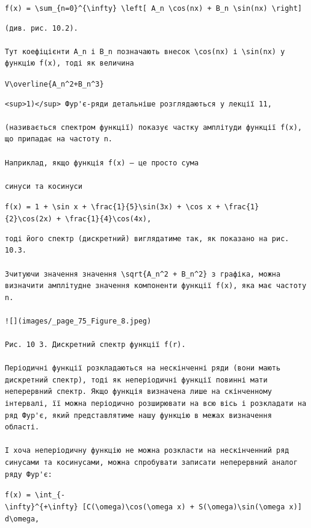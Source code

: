 \documentclass[
  ukrainian,
]{article}
\begin{document}
\texttt{f(x)\ =\ \textbackslash{}sum\_\{n=0\}\^{}\{\textbackslash{}infty\}\ \textbackslash{}left{[}\ A\_n\ \textbackslash{}cos(nx)\ +\ B\_n\ \textbackslash{}sin(nx)\ \textbackslash{}right{]}}

\begin{verbatim}
(див. рис. 10.2).

Тут коефіцієнти A_n і B_n позначають внесок \cos(nx) і \sin(nx) у функцію f(x), тоді як величина
\end{verbatim}

\texttt{V\textbackslash{}overline\{A\_n\^{}2+B\_n\^{}3\}}

\begin{verbatim}
<sup>1)</sup> Фур'є-ряди детальніше розглядаються у лекції 11,

(називається спектром функції) показує частку амплітуди функції f(x), що припадає на частоту n.

Наприклад, якщо функція f(x) — це просто сума

синуси та косинуси
\end{verbatim}

\texttt{f(x)\ =\ 1\ +\ \textbackslash{}sin\ x\ +\ \textbackslash{}frac\{1\}\{5\}\textbackslash{}sin(3x)\ +\ \textbackslash{}cos\ x\ +\ \textbackslash{}frac\{1\}\{2\}\textbackslash{}cos(2x)\ +\ \textbackslash{}frac\{1\}\{4\}\textbackslash{}cos(4x),}

\begin{verbatim}
тоді його спектр (дискретний) виглядатиме так, як показано на рис. 10.3.

Зчитуючи значення значення \sqrt{A_n^2 + B_n^2} з графіка, можна визначити амплітудне значення компоненти функції f(x), яка має частоту n.

![](images/_page_75_Figure_8.jpeg)

Рис. 10 3. Дискретний спектр функції f(r).

Періодичні функції розкладаються на нескінченні ряди (вони мають дискретний спектр), тоді як неперіодичні функції повинні мати неперервний спектр. Якщо функція визначена лише на скінченному інтервалі, її можна періодично розширювати на всю вісь і розкладати на ряд Фур'є, який представлятиме нашу функцію в межах визначення області.

І хоча неперіодичну функцію не можна розкласти на нескінченний ряд синусами та косинусами, можна спробувати записати неперервний аналог ряду Фур'є:
\end{verbatim}

\texttt{f(x)\ =\ \textbackslash{}int\_\{-\textbackslash{}infty\}\^{}\{+\textbackslash{}infty\}\ {[}C(\textbackslash{}omega)\textbackslash{}cos(\textbackslash{}omega\ x)\ +\ S(\textbackslash{}omega)\textbackslash{}sin(\textbackslash{}omega\ x){]}\ d\textbackslash{}omega,}
\end{document}
